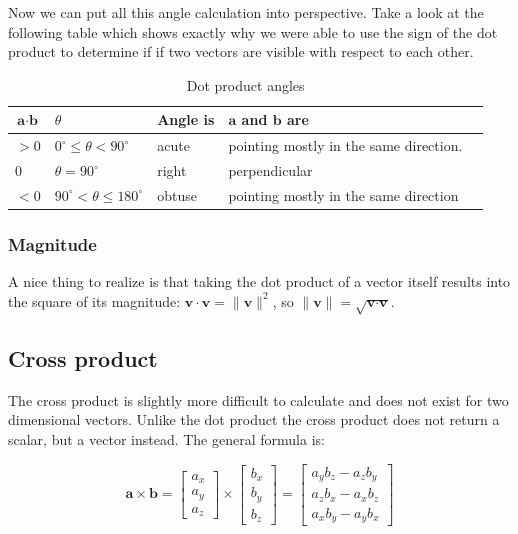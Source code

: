 \documentclass[11pt]{article}
\begin{document}
Now we can put all this angle calculation into perspective. Take a look at the following table which shows exactly why we were able to use the sign of the dot product to determine if if two vectors are visible with respect to each other.

\begin{table}[H]
\centering
\begin{tabular}{|l|l|l|l|l|}
\hline
$\textbf{a}\cdot\textbf{b}$ & $\theta$ & \textbf{Angle is} & $\textbf{a}$ \textbf{and} $\textbf{b}$ \textbf{are}  \\ \hline
$>0$ & $0^\circ \leq \theta < 90^\circ$ & acute & pointing mostly in the same direction. \\ \hline
$0$ & $\theta=90^\circ$ & right & perpendicular \\ \hline
$<0$ & $90^\circ < \theta \leq 180^\circ$ & obtuse & pointing mostly in the same direction \\ \hline
\end{tabular}
\caption{Dot product angles}
\label{tab:dot-product-angles}
\end{table}

\subsubsection{Magnitude}

A nice thing to realize is that taking the dot product of a vector itself results into the square of its magnitude: $\textbf{v}\cdot\textbf{v}=\|\textbf{v}\|^2$, so $\|\textbf{v}\|=\sqrt{\textbf{v}\cdot\textbf{v}}$.

\subsection{Cross product}

The cross product is slightly more difficult to calculate and does not exist for two dimensional vectors. Unlike the dot product the cross product does not return a scalar, but a vector instead. The general formula is:

$$
\textbf{a}\times\textbf{b}=
\begin{bmatrix}
a_x \\ a_y \\ a_z
\end{bmatrix}\times
\begin{bmatrix}
b_x \\ b_y \\ b_z
\end{bmatrix}=
\begin{bmatrix}
a_yb_z - a_zb_y \\ a_zb_x - a_xb_z \\ a_xb_y - a_yb_x
\end{bmatrix}
$$
\end{document}
